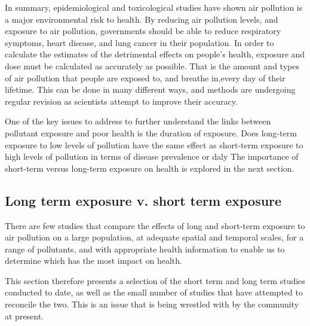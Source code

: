 In summary, epidemiological and toxicological studies have shown air pollution is a major environmental risk to health. By reducing air pollution levels, and exposure to air pollution, governments should be able to reduce respiratory symptoms, heart disease, and lung cancer in their population. In order to calculate the estimates of the detrimental effects on people's health, exposure and dose must be calculated as accurately as possible. That is the amount and types of air pollution that people are exposed to, and breathe in,every day of their lifetime. This can be done in many different ways, and methods are undergoing regular revision as scientists attempt to improve their accuracy. 

One of the key issues to address to further understand the links between pollutant exposure and poor health is the duration of exposure. Does long-term exposure to low levels of pollution have the same effect as short-term exposure to high levels of pollution in terms of disease prevalence or \gls{daly} The importance of short-term versus long-term exposure on health is explored in the next section.


\subsection{Long term exposure v. short term exposure}
\label{subsec:longtermvshortterm}

There are few studies that compare the effects of long and short-term exposure to air pollution on a large population, at adequate spatial and temporal scales, for a range of pollutants, and with appropriate health information to enable us to determine which has the most impact on health.


This section therefore presents a selection of the short term and long term studies conducted to date, as well as the small number of studies that have attempted to reconcile the two. This is an issue that is being wrestled with by the community at present.

